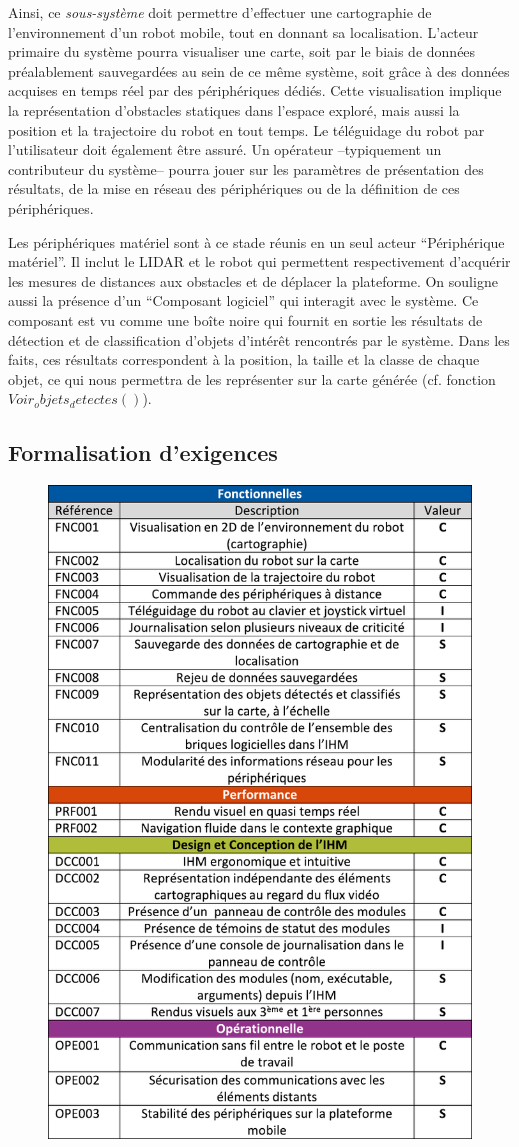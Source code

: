 Ainsi, ce \emph{sous-système} doit permettre d'effectuer une cartographie de l'environnement d'un robot mobile, tout en donnant sa localisation. 
L'acteur primaire du système pourra visualiser une carte, soit par le biais de données préalablement sauvegardées au sein de ce même système, soit grâce à des données acquises en temps réel par des périphériques dédiés. 
Cette visualisation implique la représentation d'obstacles statiques dans l'espace exploré, mais aussi la position et la trajectoire du robot en tout temps.
Le téléguidage du robot par l'utilisateur doit également être assuré. 
Un opérateur --typiquement un contributeur du système-- pourra jouer sur les paramètres de présentation des résultats, de la mise en réseau des périphériques ou de la définition de ces périphériques. 

Les périphériques matériel sont à ce stade réunis en un seul acteur ``Périphérique matériel''.
Il inclut le LIDAR et le robot qui permettent respectivement d'acquérir les mesures de distances aux obstacles et de déplacer la plateforme.
On souligne aussi la présence d'un ``Composant logiciel'' qui interagit avec le système.
Ce composant est vu comme une boîte noire qui fournit en sortie les résultats de détection et de classification d'objets d'intérêt rencontrés par le système.
Dans les faits, ces résultats correspondent à la position, la taille et la \gls{classe} de chaque objet, ce qui nous permettra de les représenter sur la carte générée (cf. fonction $Voir_objets_detectes()$).

\subsection{Formalisation d'exigences}

\begin{figure}[h]
  \centering
    \includegraphics[width=.65\linewidth]{figures/exigences}  
  \label{fig:exigences}
\end{figure}


